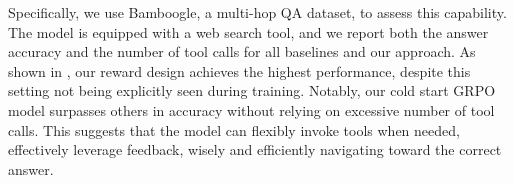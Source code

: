 Specifically, we use Bamboogle, a multi-hop QA dataset, to assess this capability. The model is equipped with a web search tool, and we report both the answer accuracy and the number of tool calls for all baselines and our approach. As shown in , our reward design achieves the highest performance, despite this setting not being explicitly seen during training. Notably, our cold start GRPO model surpasses others in accuracy without relying on excessive number of tool calls. This suggests that the model can flexibly invoke tools when needed, effectively leverage feedback, wisely and efficiently navigating toward the correct answer.




